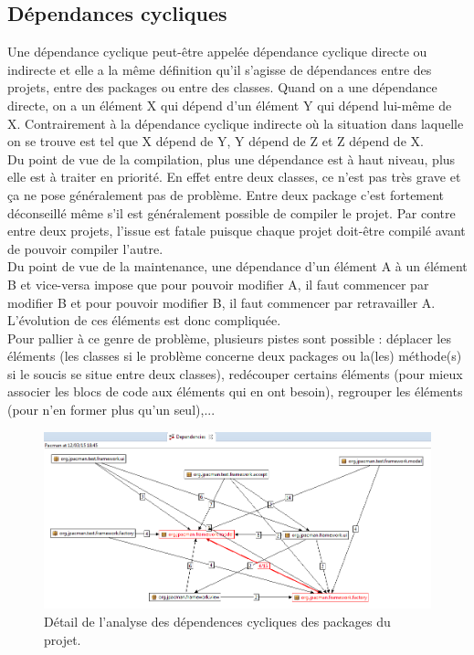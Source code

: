 \documentclass[12pt,a4paper,final]{article}
\begin{document}
\subsection{Dépendances cycliques}\label{dépendances}
Une dépendance cyclique peut-être appelée dépendance cyclique directe ou indirecte et elle a la même définition qu'il s'agisse de dépendances entre des projets, entre des packages ou entre des classes. Quand on a une dépendance directe, on a un élément X qui dépend d’un élément Y qui dépend lui-même de X. Contrairement à la dépendance cyclique indirecte où la situation dans laquelle on se trouve est tel que X dépend de Y, Y dépend de Z et Z dépend de X.\\
Du point de vue de la compilation, plus une dépendance est à haut niveau, plus elle est à traiter en priorité. En effet entre deux classes, ce n'est pas très grave et ça ne pose généralement pas de problème. Entre deux package c'est fortement déconseillé même s'il est généralement possible de compiler le projet. Par contre entre deux projets, l'issue est fatale puisque chaque projet doit-être compilé avant de pouvoir compiler l'autre.\\
Du point de vue de la maintenance, une dépendance d'un élément A à un élément B et vice-versa impose que pour pouvoir modifier A, il faut commencer par modifier B et pour pouvoir modifier B, il faut commencer par retravailler A. L'évolution de ces éléments est donc compliquée.\\
Pour pallier à ce genre de problème, plusieurs pistes sont possible : déplacer les éléments (les classes si le problème concerne deux packages ou la(les) méthode(s) si le soucis se situe entre deux classes), redécouper certains éléments (pour mieux associer les blocs de code aux éléments qui en ont besoin), regrouper les éléments (pour n'en former plus qu'un seul),... %
\begin{figure}[!h]
	\centering
	\includegraphics[width=\textwidth]{DependenciesPackages.png}
	\caption{\label{dependenciesPackage}Détail de l'analyse des dépendences cycliques des packages du projet.}
\end{figure}
\end{document}
